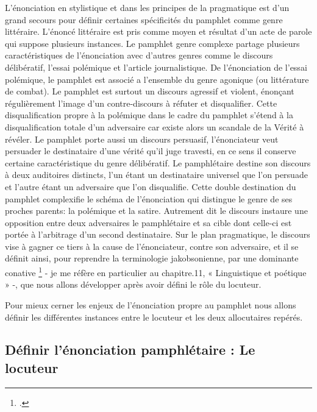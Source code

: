 L'énonciation en stylistique et dans les principes de la pragmatique est d'un grand secours pour définir certaines spécificités du pamphlet comme genre littéraire. L'énoncé littéraire est pris comme moyen et résultat d'un acte de parole qui suppose plusieurs instances. Le pamphlet genre complexe partage plusieurs caractéristiques de l'énonciation avec d'autres genres comme le discours délibératif, l'essai polémique et l'article journalistique. De l'énonciation de l'essai polémique, le pamphlet est associé a l'ensemble du genre agonique (ou littérature de combat). Le pamphlet est surtout un discours agressif et violent, énonçant régulièrement l'image d'un contre-discours à réfuter et disqualifier. Cette disqualification propre à la polémique dans le cadre du pamphlet s'étend à la disqualification totale d'un adversaire car existe alors un scandale de la Vérité à révéler. Le pamphlet porte aussi un discours persuasif, l'énonciateur veut persuader le destinataire d'une vérité qu'il juge travesti, en ce sens il conserve certaine caractéristique du genre délibératif. Le pamphlétaire destine son discours à deux auditoires distincts, l'un étant un destinataire universel que l'on persuade et l'autre étant un adversaire que l'on disqualifie. Cette double destination du pamphlet complexifie le schéma de l'énonciation qui distingue le genre de ses proches parents: la polémique et la satire. Autrement dit le discours instaure une opposition entre deux adversaires le pamphlétaire et sa cible dont celle-ci est portée à l'arbitrage d'un second destinataire. Sur le plan pragmatique, le discours vise à gagner ce tiers à la cause de l'énonciateur, contre son adversaire, et il se définit ainsi, pour reprendre la terminologie jakobsonienne, par une dominante conative \footcites{jakobson_essais_1963} - je me réfère en particulier au chapitre.11, « Linguistique et poétique » -, que nous allons développer après avoir défini le rôle du locuteur. 

Pour mieux cerner les enjeux de l'énonciation propre au pamphlet nous allons définir les différentes instances entre le locuteur et les deux allocutaires repérés.

\subsection{Définir l'énonciation pamphlétaire : Le locuteur}

